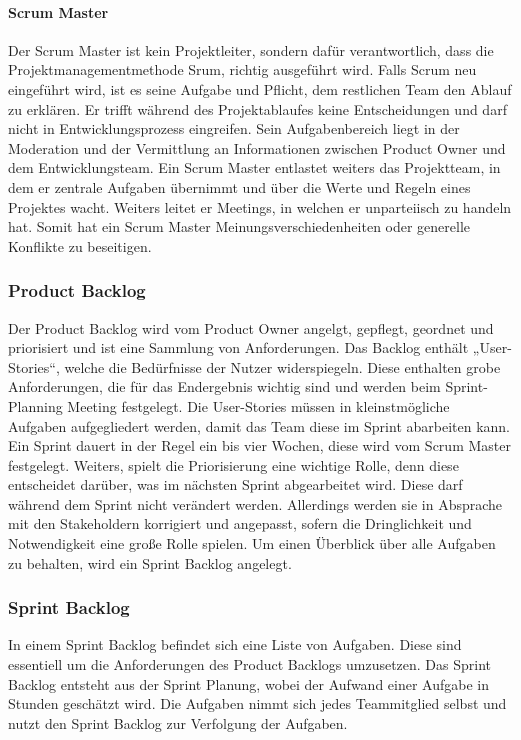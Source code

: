\paragraph{Scrum Master}

Der Scrum Master ist kein Projektleiter, sondern dafür verantwortlich, dass die Projektmanagementmethode Srum, richtig ausgeführt wird. Falls Scrum neu eingeführt wird, ist es seine Aufgabe und Pflicht, dem restlichen Team den Ablauf zu erklären. Er trifft während des Projektablaufes keine Entscheidungen und darf nicht in Entwicklungsprozess eingreifen. Sein Aufgabenbereich liegt in der Moderation und der Vermittlung an Informationen zwischen Product Owner und dem Entwicklungsteam. Ein Scrum Master entlastet weiters das Projektteam, in dem er zentrale Aufgaben übernimmt und über die Werte und Regeln eines Projektes wacht. Weiters leitet er Meetings, in welchen er unparteiisch zu handeln hat. Somit hat ein Scrum Master Meinungsverschiedenheiten oder generelle Konflikte zu beseitigen. 

\subsubsection{Product Backlog} 
Der Product Backlog wird vom Product Owner angelgt, gepflegt, geordnet und priorisiert und ist eine Sammlung von Anforderungen. Das Backlog enthält „User-Stories“, welche die Bedürfnisse der Nutzer widerspiegeln. Diese enthalten grobe Anforderungen, die für das Endergebnis wichtig sind und werden beim Sprint-Planning Meeting festgelegt. Die User-Stories müssen in kleinstmögliche Aufgaben aufgegliedert werden, damit das Team diese im Sprint abarbeiten kann. Ein Sprint dauert in der Regel ein bis vier Wochen, diese wird vom Scrum Master festgelegt. Weiters, spielt die Priorisierung eine wichtige Rolle, denn diese entscheidet darüber, was im nächsten Sprint abgearbeitet wird. Diese darf während dem Sprint nicht verändert werden. Allerdings werden sie in Absprache mit den Stakeholdern korrigiert und angepasst, sofern die Dringlichkeit und Notwendigkeit eine große Rolle spielen. Um einen Überblick über alle Aufgaben zu behalten, wird ein Sprint Backlog angelegt. 

\subsubsection{Sprint Backlog} 
In einem Sprint Backlog befindet sich eine Liste von Aufgaben. Diese sind essentiell um die Anforderungen des Product Backlogs umzusetzen. Das Sprint Backlog entsteht aus der Sprint Planung, wobei der Aufwand einer Aufgabe in Stunden geschätzt wird. Die Aufgaben nimmt sich jedes Teammitglied selbst und nutzt den Sprint Backlog zur Verfolgung der Aufgaben. 


